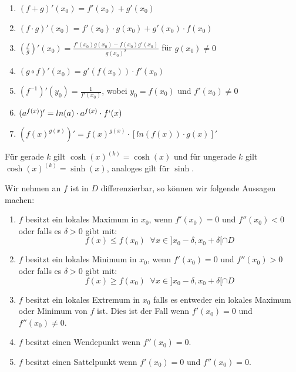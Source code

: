 
\begin{enumerate}[label = (\arabic*)]
    \item $(f + g)'(x_0) = f'(x_0) + g'(x_0)$
    \item $(f \cdot g)'(x_0) = f'(x_0) \cdot g(x_0) + g'(x_0) \cdot f(x_0)$
    \item $(\frac{f}{g})'(x_0) = \frac{f'(x_0)g(x_0) - f(x_0)g'(x_0)}{g(x_0)^2}$ für $g(x_0) \neq 0$
    \item $(g \circ f)'(x_0) = g'(f(x_0)) \cdot f'(x_0)$
    \item $(f^{-1})'(y_0) = \frac{1}{f'(x_0)}$, wobei $y_0 = f(x_0)$ und $f'(x_0) \neq 0$
    \item $(a^{f(x)})' = ln(a)\cdot a^{f(x)} \cdot f`(x)$
    \item $(f(x)^{g(x)})' = f(x)^{g(x)} \cdot [ln(f(x))\cdot g(x)]'$
\end{enumerate}

\Bem Für gerade $k$ gilt $\cosh(x)^{(k)} = \cosh(x)$ und für ungerade $k$ gilt $\cosh(x)^{(k)} = \sinh(x)$,
analoges gilt für $\sinh$.


\columnbreak



Wir nehmen an $f$ ist in $D$ differenzierbar, so können wir folgende Aussagen machen:
\begin{enumerate}[label = (\arabic*)]
    \item $f$ besitzt ein lokales Maximum in $x_0$, wenn $f'(x_0) = 0$ und $f''(x_0) < 0$ oder falls es $\delta > 0$ gibt mit:
    $$f(x) \leq f(x_0) \; \; \forall x \in ]x_0 - \delta, x_0 + \delta[ \cap D$$
    \item $f$ besitzt ein lokales Minimum in $x_0$, wenn $f'(x_0) = 0$ und $f''(x_0) > 0$ oder falls es $\delta > 0$ gibt mit:
    $$f(x) \geq f(x_0) \; \; \forall x \in ]x_0 - \delta, x_0 + \delta[ \cap D$$
    \item $f$ besitzt ein lokales Extremum in $x_0$ falls es entweder ein lokales Maximum oder Minimum
    von $f$ ist. Dies ist der Fall wenn $f'(x_0) = 0$ und $f''(x_0) \neq 0$.
    \item $f$ besitzt einen Wendepunkt wenn $f''(x_0) = 0$.
    \item $f$ besitzt einen Sattelpunkt wenn $f'(x_0) = 0$ und $f''(x_0) = 0$.
\end{enumerate}

